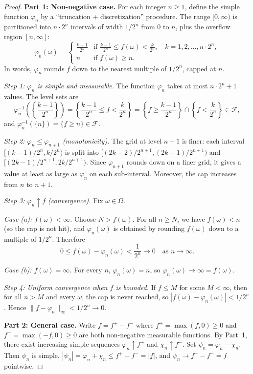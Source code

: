 \documentclass[11pt,a4paper]{article}
\begin{document}
\begin{proof}
\textbf{Part 1: Non-negative case.}
For each integer $n \geq 1$, define the simple function $\varphi_n$ by
a ``truncation + discretization'' procedure. The range $[0, \infty)$ is
partitioned into $n \cdot 2^n$ intervals of width $1/2^n$ from $0$ to $n$,
plus the overflow region $[n, \infty]$:
\begin{equation}
  \varphi_n(\omega) =
  \begin{cases}
    \displaystyle\frac{k-1}{2^n}
      & \text{if } \frac{k-1}{2^n} \leq f(\omega) < \frac{k}{2^n},
        \quad k = 1, 2, \ldots, n \cdot 2^n, \\[6pt]
    n & \text{if } f(\omega) \geq n.
  \end{cases}
  \label{eq:approx_construction}
\end{equation}
In words, $\varphi_n$ rounds $f$ down to the nearest multiple of $1/2^n$,
capped at $n$.

\textit{Step 1: $\varphi_n$ is simple and measurable.}
The function $\varphi_n$ takes at most $n \cdot 2^n + 1$ values. The
level sets are
\[
  \varphi_n^{-1}\!\left(\left\{\frac{k-1}{2^n}\right\}\right)
  = \left\{\frac{k-1}{2^n} \leq f < \frac{k}{2^n}\right\}
  = \left\{f \geq \frac{k-1}{2^n}\right\}
    \cap \left\{f < \frac{k}{2^n}\right\} \in \mathcal{F},
\]
and $\varphi_n^{-1}(\{n\}) = \{f \geq n\} \in \mathcal{F}$.

\textit{Step 2: $\varphi_n \leq \varphi_{n+1}$ (monotonicity).}
The grid at level $n+1$ is finer: each interval
$[(k-1)/2^n, k/2^n)$ is split into
$[(2k-2)/2^{n+1}, (2k-1)/2^{n+1})$ and $[(2k-1)/2^{n+1}, 2k/2^{n+1})$.
Since $\varphi_{n+1}$ rounds down on a finer grid, it gives a value at
least as large as $\varphi_n$ on each sub-interval. Moreover, the cap
increases from $n$ to $n+1$.

\textit{Step 3: $\varphi_n \uparrow f$ (convergence).}
Fix $\omega \in \Omega$.

\textit{Case (a): $f(\omega) < \infty$.} Choose $N > f(\omega)$. For all
$n \geq N$, we have $f(\omega) < n$ (so the cap is not hit), and
$\varphi_n(\omega)$ is obtained by rounding $f(\omega)$ down to a multiple
of $1/2^n$. Therefore
\[
  0 \leq f(\omega) - \varphi_n(\omega) < \frac{1}{2^n} \to 0
  \quad \text{as } n \to \infty.
\]

\textit{Case (b): $f(\omega) = \infty$.} For every $n$, $\varphi_n(\omega) = n$,
so $\varphi_n(\omega) \to \infty = f(\omega)$.

\textit{Step 4: Uniform convergence when $f$ is bounded.}
If $f \leq M$ for some $M < \infty$, then for all $n > M$ and every
$\omega$, the cap is never reached, so
$|f(\omega) - \varphi_n(\omega)| < 1/2^n$. Hence
$\|f - \varphi_n\|_\infty < 1/2^n \to 0$.

\medskip
\textbf{Part 2: General case.}
Write $f = f^+ - f^-$ where $f^+ = \max(f, 0) \geq 0$ and
$f^- = \max(-f, 0) \geq 0$ are both non-negative measurable functions.
By Part~1, there exist increasing simple sequences $\varphi_n \uparrow f^+$
and $\chi_n \uparrow f^-$. Set $\psi_n = \varphi_n - \chi_n$. Then
$\psi_n$ is simple, $|\psi_n| = \varphi_n + \chi_n \leq f^+ + f^- = |f|$,
and $\psi_n \to f^+ - f^- = f$ pointwise.
\end{proof}
\end{document}
